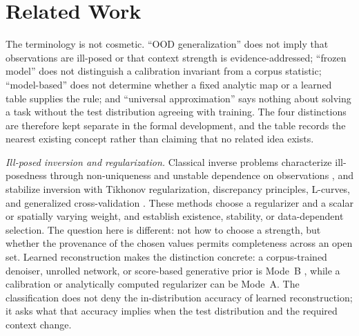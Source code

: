 \documentclass[twoside,11pt]{article}
\begin{document}
\section{Related Work}
\label{ch:related}%



The terminology is not cosmetic. ``OOD generalization'' does not imply that observations are ill-posed or that context strength is evidence-addressed; ``frozen model'' does not distinguish a calibration invariant from a corpus statistic; ``model-based'' does not determine whether a fixed analytic map or a learned table supplies the rule; and ``universal approximation'' says nothing about solving a task without the test distribution agreeing with training. The four distinctions are therefore kept separate in the formal development, and the table records the nearest existing concept rather than claiming that no related idea exists.

\emph{Ill-posed inversion and regularization.}
Classical inverse problems characterize ill-posedness through non-uniqueness and unstable dependence on observations \citep{hadamard1902}, and stabilize inversion with Tikhonov regularization, discrepancy principles, L-curves, and generalized cross-validation \citep{tikhonov1977,hansen1992,golub1979}. These methods choose a regularizer and a scalar or spatially varying weight, and establish existence, stability, or data-dependent selection. The question here is different: not how to choose a strength, but whether the provenance of the chosen values permits completeness across an open set. Learned reconstruction makes the distinction concrete: a corpus-trained denoiser, unrolled network, or score-based generative prior is Mode~B \citep{gregor2010,adler2018,ongie2020,song2021}, while a calibration or analytically computed regularizer can be Mode~A. The classification does not deny the in-distribution accuracy of learned reconstruction; it asks what that accuracy implies when the test distribution and the required context change.
\end{document}
